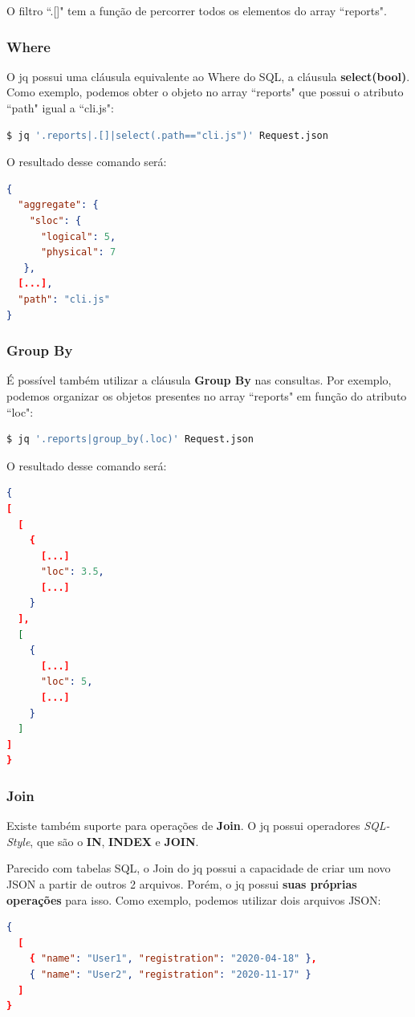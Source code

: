 \documentclass[a4paper, 12pt] {article}
\begin{document}
				O filtro “.[]" tem a função de percorrer todos os elementos do array “reports".
			\newpage \subsubsection{Where}
				O jq possui uma cláusula equivalente ao Where do SQL, a cláusula \textbf{select(bool)}. Como exemplo, podemos obter o objeto no array “reports" que possui o atributo “path" igual a “cli.js":
\begin{lstlisting}[language=bash]
$ jq '.reports|.[]|select(.path=="cli.js")' Request.json
\end{lstlisting}

				O resultado desse comando será:

\begin{lstlisting}[language=json,firstnumber=1]
{
  "aggregate": {
    "sloc": {
      "logical": 5,
      "physical": 7
   },
  [...],
  "path": "cli.js"
}
\end{lstlisting}
			\subsubsection{Group By}
				É possível também utilizar a cláusula \textbf{Group By} nas consultas. Por exemplo, podemos organizar os objetos presentes no array “reports" em função do atributo  “loc":
\begin{lstlisting}[language=bash]
$ jq '.reports|group_by(.loc)' Request.json
\end{lstlisting}

				O resultado desse comando será:

\begin{lstlisting}[language=json,firstnumber=1]
{
[
  [
    {
      [...]
      "loc": 3.5,
      [...]
    }
  ],
  [
    {
      [...]
      "loc": 5,
      [...]
    }
  ]
]
}
\end{lstlisting}
			\newpage \subsubsection{Join}
				Existe também suporte para operações de \textbf{Join}. O jq possui operadores \textit{SQL-Style}, que são o  \textbf{IN},  \textbf{INDEX} e  \textbf{JOIN}.

				Parecido com tabelas SQL, o Join do jq possui a capacidade de criar um novo JSON a partir de outros 2 arquivos. Porém, o jq possui \textbf{suas próprias operações} para isso. Como exemplo, podemos utilizar dois arquivos JSON:
\begin{lstlisting}[language=json,firstnumber=1]
{
  [
    { "name": "User1", "registration": "2020-04-18" },
    { "name": "User2", "registration": "2020-11-17" }
  ]
}
\end{lstlisting}
\end{document}
